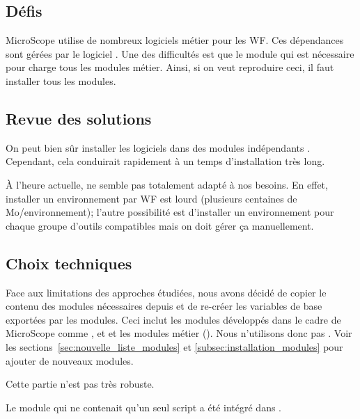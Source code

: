 \subsection{Défis}

MicroScope utilise de nombreux logiciels métier pour les WF.
Ces dépendances sont gérées par le logiciel .
Une des difficultés est que le module  qui est nécessaire pour 
charge tous les modules métier.
Ainsi, si on veut reproduire ceci, il faut installer tous les modules.

\subsection{Revue des solutions}

On peut bien sûr installer les logiciels dans des modules indépendants .
Cependant, cela conduirait rapidement à un temps d'installation très long.

À l'heure actuelle,  ne semble pas totalement adapté à nos besoins.
En effet, installer un environnement par WF est lourd (plusieurs centaines de Mo/environnement);
l'autre possibilité est d'installer un environnement pour chaque groupe d'outils compatibles mais on doit gérer ça manuellement.

\subsection{Choix techniques}

Face aux limitations des approches étudiées, nous avons décidé de copier le contenu des modules nécessaires depuis 
et de re-créer les variables de base exportées par les modules.
Ceci inclut les modules développés dans le cadre de MicroScope comme ,  et 
et les modules métier ().
Nous n'utilisons donc pas .
Voir les sections~\ref{sec:nouvelle_liste_modules} et \ref{subsec:installation_modules} pour ajouter de nouveaux modules.

\begin{warningbox}
    Cette partie n'est pas très robuste.
\end{warningbox}

\begin{warningbox}
    Le module  qui ne contenait qu'un seul script a été intégré dans
    \href{https://intranet.genoscope.cns.fr/agc/redmine/versions/158}{}.
\end{warningbox}

